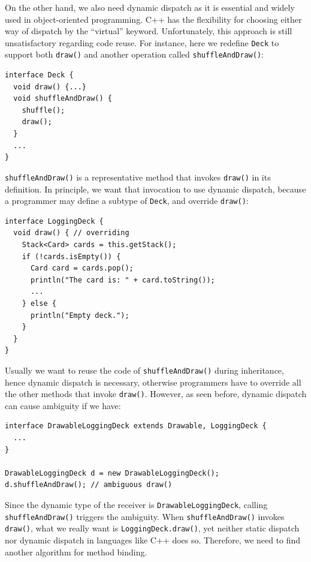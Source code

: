 On the other hand, we also need dynamic dispatch as it is essential and widely used in object-oriented programming.
C++ has the flexibility for choosing either way of dispatch by the ``virtual'' keyword.
Unfortunately, this approach is still unsatisfactory regarding code reuse. For instance, here we redefine \lstinline|Deck| to support
both \lstinline|draw()| and another operation called \lstinline|shuffleAndDraw()|:
\vspace{3pt}\begin{lstlisting}
interface Deck {
  void draw() {...}
  void shuffleAndDraw() {
    shuffle();
    draw();
  }
  ...
}
\end{lstlisting}\vspace{3pt}
\lstinline|shuffleAndDraw()| is a representative method that invokes \lstinline|draw()| in its definition. In principle, we want
that invocation to use dynamic dispatch, because a programmer may define a subtype of \lstinline|Deck|, and override \lstinline|draw()|:
\vspace{3pt}\begin{lstlisting}
interface LoggingDeck {
  void draw() { // overriding
    Stack<Card> cards = this.getStack();
    if (!cards.isEmpty()) {
      Card card = cards.pop();
      println("The card is: " + card.toString());
      ...
    } else {
      println("Empty deck.");
    }
  }
}
\end{lstlisting}\vspace{3pt}
Usually we want to reuse the code of \lstinline|shuffleAndDraw()| during inheritance, hence dynamic dispatch is necessary, otherwise
programmers have to override all the other methods that invoke \lstinline|draw()|. However, as seen before, dynamic dispatch can cause
ambiguity if we have:
\vspace{3pt}\begin{lstlisting}
interface DrawableLoggingDeck extends Drawable, LoggingDeck {
  ...
}

DrawableLoggingDeck d = new DrawableLoggingDeck();
d.shuffleAndDraw(); // ambiguous draw()
\end{lstlisting}\vspace{3pt}
Since the dynamic type of the receiver is \lstinline|DrawableLoggingDeck|, calling \lstinline|shuffleAndDraw()| triggers the ambiguity. When \lstinline|shuffleAndDraw()| invokes \lstinline|draw()|, what we really want is \lstinline|LoggingDeck.draw()|, yet
neither static dispatch nor dynamic dispatch in languages like C++ does so.
 Therefore, we need to find another algorithm for method binding.

